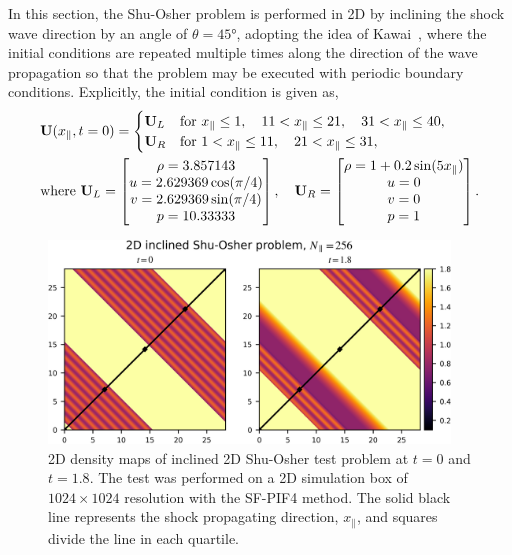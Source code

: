 In this section, the Shu-Osher problem is performed in 2D by inclining the shock wave direction
by an angle of \(\theta = \ang{45} \),
adopting the idea of Kawai~\cite{kawai2013divergence},
where the initial conditions are repeated multiple times along the direction of the
wave propagation so that the problem may be executed with periodic boundary conditions.
Explicitly, the initial condition is given as,
\begin{equation}\label{eq:shu45_gov}
    \begin{split}
        &\mathbf{U}(x_{\parallel}, t=0) = \begin{cases}
            \mathbf{U}_{L} & \text{for } x_{\parallel} \le 1, \quad 11 < x_{\parallel} \le 21, \quad 31 < x_{\parallel} \le 40, \\
            \mathbf{U}_{R} & \text{for } 1 < x_{\parallel} \le 11, \quad 21 < x_{\parallel} \le 31,
        \end{cases}\\
        &\text{where } \mathbf{U}_{L} = \begin{bmatrix}
            \rho = 3.857143 \\
            u = 2.629369\cos(\pi/4) \\
            v = 2.629369\sin(\pi/4) \\
            p = 10.33333
        \end{bmatrix},\quad
        \mathbf{U}_{R} = \begin{bmatrix}
            \rho = 1 + 0.2\sin(5 x_{\parallel}) \\
            u = 0 \\
            v = 0 \\
            p = 1
        \end{bmatrix}.
    \end{split}
\end{equation}

\begin{figure}
    \centering
    \includegraphics[width=0.95\textwidth]{fig/shu45_2d_snapshot.png}
    \caption{2D density maps of inclined 2D Shu-Osher test problem
        at \( t=0 \) and \( t=1.8 \). The test was performed on a 2D simulation box
        of \(1024 \times 1024 \) resolution with the SF-PIF4 method.
        The solid black line represents the shock propagating direction, \( x_{\parallel} \),
        and squares divide the line in each quartile.
    }\label{fig:shu45_cmap}
\end{figure}

